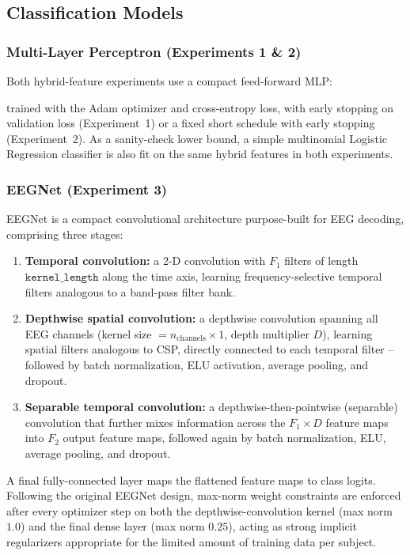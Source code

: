 \documentclass[11pt,a4paper]{article}
\begin{document}
\subsection{Classification Models}

\subsubsection{Multi-Layer Perceptron (Experiments 1 \& 2)}
\label{sec:mlp}
Both hybrid-feature experiments use a compact feed-forward MLP:
\begin{center}
\end{center}
trained with the Adam optimizer and cross-entropy loss, with early stopping on validation loss
(Experiment~1) or a fixed short schedule with early stopping (Experiment~2). As a sanity-check lower
bound, a simple multinomial Logistic Regression classifier is also fit on the same hybrid features in
both experiments.

\subsubsection{EEGNet (Experiment 3)}
\label{sec:eegnet}
EEGNet \cite{lawhern2018eegnet} is a compact convolutional architecture purpose-built for EEG
decoding, comprising three stages:
\begin{enumerate}[leftmargin=1.2cm]
    \item \textbf{Temporal convolution:} a 2-D convolution with $F_1$ filters of length
    $\texttt{kernel\_length}$ along the time axis, learning frequency-selective temporal filters
    analogous to a band-pass filter bank.
    \item \textbf{Depthwise spatial convolution:} a depthwise convolution spanning all EEG channels
    (kernel size $= n_{\text{channels}} \times 1$, depth multiplier $D$), learning spatial filters
    analogous to CSP, directly connected to each temporal filter -- followed by batch normalization,
    ELU activation, average pooling, and dropout.
    \item \textbf{Separable temporal convolution:} a depthwise-then-pointwise (separable) convolution
    that further mixes information across the $F_1{\times}D$ feature maps into $F_2$ output feature
    maps, followed again by batch normalization, ELU, average pooling, and dropout.
\end{enumerate}
A final fully-connected layer maps the flattened feature maps to class logits. Following the original
EEGNet design, max-norm weight constraints are enforced after every optimizer step on both the
depthwise-convolution kernel (max norm $1.0$) and the final dense layer (max norm $0.25$), acting as
strong implicit regularizers appropriate for the limited amount of training data per subject.
\end{document}
